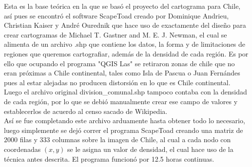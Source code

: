 \documentclass[20pt]{report}
\begin{document}
\begin{itemize}
Esta es la base te\'orica en la que se bas\'o el proyecto del cartograma para Chile, as\'i pues se encontr\'o el software ScapeToad  creado por Dominique Andrieu, Christian Kaiser y Andr\'e Ourednik que  hace uso de exactamente  del dise\~no para crear cartogramas de Michael T. Gastner and M. E. J. Newman, el cual se alimenta de un archivo .shp  que contiene los datos, la forma  y de limitaciones de regiones que  queremos cartografiar, adem\'as de la densidad de cada regi\'on. Es por ello que ocupando el programa "QGIS Las" se retiraron zonas de chile que no eran pr\'oximas a Chile continental, tales como Isla de Pascua o Juan Fern\'andes pues al estar alejadas no producen distorsi\'on en lo que es  Chile continental. \\
Luego el archivo original division\_comunal.shp tampoco contaba con la densidad de cada regi\'on, por lo que se debi\'o  manualmente  crear ese campo de valores y establecerlos de acuerdo al censo sacado de Wikipedia. \\
As\'i  se fue completando este archivo arduamente hasta obtener todo lo necesario, luego simplemente se dej\'o correr el programa ScapeToad creando una matriz de $2000$ filas y $333$ columnas sobre la imagen de Chile, al cual a cada nodo con  coordenadas $(x,y)$ se le asigna un valor de densidad, el cual   hace uso de la t\'ecnica antes descrita. El programa funcion\'o por 12.5 horas continuas.
\pagebreak


\end{itemize}
\end{document}
